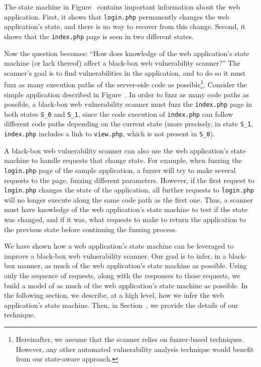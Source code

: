 The state machine in Figure~ contains important
information about the web application. First, it shows that \texttt{login.php}
permanently changes the web application's state, and there is no way to recover
from this change. Second, it shows that the \texttt{index.php} page is seen in
two different states.

Now the question becomes: ``How does knowledge of the web application's state
machine (or lack thereof) affect a black-box web vulnerability scanner?'' The
scanner's goal is to find vulnerabilities in the application, and to do so it
must fuzz as many execution paths of the server-side code as
possible\footnote{Hereinafter, we assume that the scanner relies on
  fuzzer-based techniques. However, any other automated vulnerability analysis
  technique would benefit from our state-aware approach.}. Consider the simple
application described in Figure~. In order to fuzz as
many code paths as possible, a black-box web vulnerability scanner must fuzz
the \texttt{index.php} page in both states \texttt{S\_0} and \texttt{S\_1},
since the code execution of \texttt{index.php} can follow different code paths
depending on the current state (more precisely, in state \texttt{S\_1},
\texttt{index.php} includes a link to \texttt{view.php}, which is not present
in \texttt{S\_0}).

A black-box web vulnerability scanner can also use the web application's state
machine to handle requests that change state. For example, when fuzzing the
\texttt{login.php} page of the sample application, a fuzzer will try to make
several requests to the page, fuzzing different parameters. However, if the
first request to \texttt{login.php} changes the state of the application, all
further requests to \texttt{login.php} will no longer execute along the same
code path as the first one. Thus, a scanner must have knowledge of the web
application's state machine to test if the state was changed, and if it was,
what requests to make to return the application to the previous state before
continuing the fuzzing process.

We have shown how a web application's state machine can be leveraged to improve
a black-box web vulnerability scanner. Our goal is to infer, in a black-box
manner, as much of the web application's state machine as possible. Using only
the sequence of requests, along with the responses to those requests, we build
a model of as much of the web application's state machine as possible. In the
following section, we describe, at a high level, how we infer the web
application's state machine. Then, in Section~, we provide the
details of our technique.

